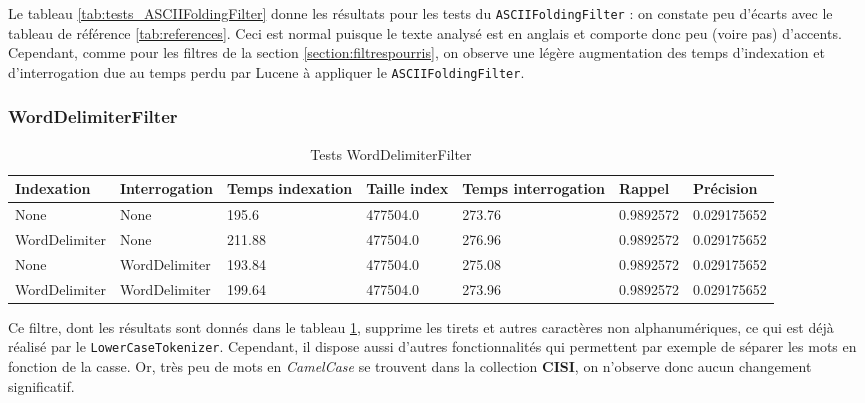 Le tableau \ref{tab:tests_ASCIIFoldingFilter} donne les résultats pour les tests du \texttt{ASCIIFoldingFilter} : on constate peu d’écarts avec le tableau de référence \ref{tab:references}. Ceci est normal puisque le texte analysé est en anglais et comporte donc peu (voire pas) d’accents. Cependant, comme pour les filtres de la section \ref{section:filtrespourris}, on observe une légère augmentation des temps d’indexation et d’interrogation due au temps perdu par Lucene à appliquer le \texttt{ASCIIFoldingFilter}.

\subsubsection{WordDelimiterFilter}

\begin{table}[!htbp]
    \hspace{-2cm}
                \begin{tabular}{|p{2.1cm}|p{2.1cm}|p{2cm}|p{2cm}|p{2.5cm}|p{2.5cm}|p{2.5cm}|}
                    \hline
                    \textbf{Indexation} & \textbf{Interrogation} & \textbf{Temps \mbox{indexation}} & \textbf{Taille \mbox{index}} & \textbf{Temps \mbox{interrogation}} & \textbf{Rappel} & \textbf{Précision}\\
                    \hline
                    None & None & 195.6 & 477504.0 & 273.76 & 0.9892572 & 0.029175652\\
                    \hline
WordDelimiter & None & 211.88 & 477504.0 & 276.96 & 0.9892572 & 0.029175652\\
		\hline
None & WordDelimiter & 193.84 & 477504.0 & 275.08 & 0.9892572 & 0.029175652\\
		\hline
WordDelimiter & WordDelimiter & 199.64 & 477504.0 & 273.96 & 0.9892572 & 0.029175652\\
                    \hline
                \end{tabular}
                \caption{Tests WordDelimiterFilter}
                \label{tab:tests_WordDelimiterFilter}
            \end{table}

Ce filtre, dont les résultats sont donnés dans le tableau \ref{tab:tests_WordDelimiterFilter}, supprime les tirets et autres caractères non alphanumériques, ce qui est déjà réalisé par le \texttt{LowerCaseTokenizer}. Cependant, il dispose aussi d’autres fonctionnalités qui permettent par exemple de séparer les mots en fonction de la casse. Or, très peu de mots en \textit{CamelCase} se trouvent dans la collection \textbf{CISI}, on n'observe donc aucun changement significatif.

